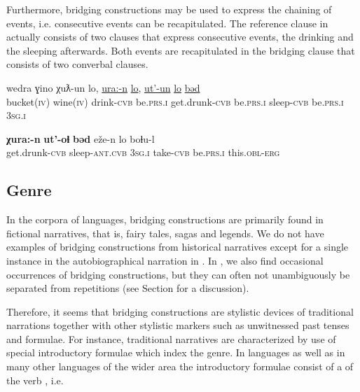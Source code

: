 \documentclass[output=paper]{LSP/langsci}
\begin{document}
Furthermore, bridging constructions may be used to express the chaining of events, i.e. consecutive events can be recapitulated. The reference clause in  actually consists of two clauses that express consecutive events, the drinking and the sleeping afterwards. Both events are recapitulated in the bridging clause that consists of two converbal clauses.


\begin{exe}
	\ex	\label{ex:23ab}
	\begin{xlist}
		\ex	\label{ex:23a}
		\gll	wedra			ɣino		χuƛ-un		lo,				\underline{ura:-n}			\underline{lo}, \underline{ut'-un}			\underline{lo}				\underline{bəd}\\
			bucket(\textsc{iv})	wine(\textsc{iv})	drink-\textsc{cvb}	be.\textsc{prs.i}		get.drunk-\textsc{cvb}	be.\textsc{prs.i} sleep-\textsc{cvb}	be.\textsc{prs.i}		\textsc{3sg.i}\\
		\glt	{}

		\ex	\label{ex:23b}
		\gll	\textbf{χura:-n}			\textbf{ut'-oɬ}				\textbf{bəd}		eže-n			lo			boɬu-l \\
			get.drunk-\textsc{cvb}	sleep-\textsc{ant.cvb}	\textsc{3sg.i}		take-\textsc{cvb}		be.\textsc{prs.i}	this.\textsc{obl-erg}\\
		\glt	{} 
	\end{xlist}
\end{exe}

\subsection{Genre}
\label{ssec:Genre}
In the corpora of  languages, bridging constructions are primarily found in fictional narratives, that is, fairy tales, sagas and legends. We do not have examples of bridging constructions from historical narratives except for a single instance in the autobiographical narration in . In , we also find occasional occurrences of bridging constructions, but they can often not unambiguously be separated from repetitions (see Section  for a discussion). 

Therefore, it seems that bridging constructions are stylistic devices of traditional narrations together with other stylistic markers such as unwitnessed past tenses and  formulae. For instance, traditional narratives are characterized by use of special introductory formulae which index the genre. In  languages as well as in many other languages of the wider area the introductory formulae consist of a  of the verb , i.e. 
\end{document}
